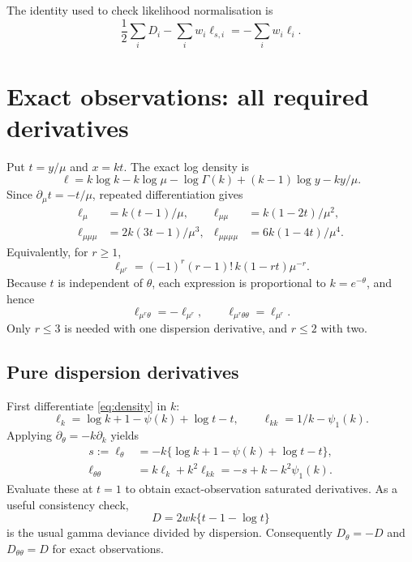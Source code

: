 \documentclass[11pt,a4paper]{article}
\begin{document}
The identity used to check likelihood normalisation is
\begin{equation}
 \frac12\sum_iD_i-\sum_iw_i\ell_{s,i}=-\sum_iw_i\ell_i.
 \label{eq:normalisation}
\end{equation}

\newpage
\section{Exact observations: all required derivatives}
Put $t=y/\mu$ and $x=kt$. The exact log density is
\begin{equation}
 \ell=k\log k-k\log\mu-\log\Gamma(k)+(k-1)\log y-ky/\mu.
 \label{eq:density}
\end{equation}
Since $\partial_\mu t=-t/\mu$, repeated differentiation gives
\begin{align}
 \ell_\mu&=k(t-1)/\mu,&
 \ell_{\mu\mu}&=k(1-2t)/\mu^2,\\
 \ell_{\mu\mu\mu}&=2k(3t-1)/\mu^3,&
 \ell_{\mu\mu\mu\mu}&=6k(1-4t)/\mu^4.
 \label{eq:exactmu}
\end{align}
Equivalently, for $r\geq1$,
\begin{equation}
 \ell_{\mu^r}=(-1)^r(r-1)!\,k(1-rt)\mu^{-r}.
 \label{eq:exactgeneral}
\end{equation}
Because $t$ is independent of $\theta$, each expression is proportional to
$k=e^{-\theta}$, and hence
\begin{equation}
 \boxed{\ell_{\mu^r\theta}=-\ell_{\mu^r},\qquad
        \ell_{\mu^r\theta\theta}=\ell_{\mu^r}.}
 \label{eq:exactmixed}
\end{equation}
Only $r\leq3$ is needed with one dispersion derivative, and $r\leq2$ with two.

\subsection{Pure dispersion derivatives}
First differentiate \eqref{eq:density} in $k$:
\[
 \ell_k=\log k+1-\psi(k)+\log t-t,
 \qquad \ell_{kk}=1/k-\psi_1(k).
\]
Applying $\partial_\theta=-k\partial_k$ yields
\begin{align}
 s:=\ell_\theta
   &=-k\{\log k+1-\psi(k)+\log t-t\},\label{eq:score}\\
 \ell_{\theta\theta}
   &=k\ell_k+k^2\ell_{kk}
    =-s+k-k^2\psi_1(k).\label{eq:score2}
\end{align}
Evaluate these at $t=1$ to obtain exact-observation saturated derivatives.
As a useful consistency check,
\[
 D=2wk\{t-1-\log t\}
\]
is the usual gamma deviance divided by dispersion. Consequently
$D_\theta=-D$ and $D_{\theta\theta}=D$ for exact observations.
\end{document}
